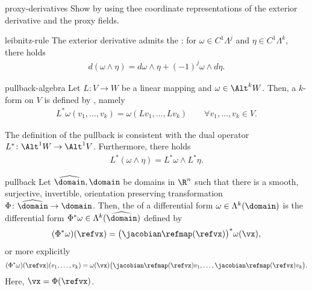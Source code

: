\begin{Problem}{proxy-derivatives}
  Show  by using thee coordinate
  representations of the exterior derivative and the proxy fields.
\end{Problem}

\begin{Lemma}{leibnitz-rule}
  The exterior derivative admits the : for
  $\omega\in C^1\Lambda^j$ and $\eta\in C^1\Lambda^k$, there holds
  \begin{gather}
    d(\omega\wedge\eta) = d\omega\wedge\eta + (-1)^j\omega\wedge d\eta.
  \end{gather}
\end{Lemma}

\begin{Definition}{pullback-algebra}
  Let $L\colon V\to W$ be a linear mapping and $\omega \in \Alt^k
  W$. Then, a $k$-form on $V$ is defined by , namely
  \begin{gather}
    L^* \omega(v_1,\dots,v_k) = \omega(Lv_1,\dots,Lv_k)
    \qquad\forall v_1,\dots,v_k\in V.
  \end{gather}
\end{Definition}

\begin{remark}
  The definition of the pullback is consistent with the dual
  operator $L^*\colon \Alt^1 W \to \Alt^1 V$. Furthermore, there holds
  \begin{gather}
    L^*(\omega\wedge\eta) = L^*\omega \wedge L^*\eta.
  \end{gather}
\end{remark}

\begin{Definition}{pullback}
  Let $\widehat\domain,\domain$ be domains in $\R^n$ such that there is a
  smooth, surjective, invertible, orientation preserving transformation
  $\Phi\colon \widehat\domain \to \domain$. Then, the  of a
  differential form $\omega \in\Lambda^k(\domain)$ is the
  differential form $\Phi^*\omega \in \Lambda^k(\widehat\domain)$ defined by
  \begin{gather}
    (\Phi^*\omega)(\refvx) = \bigl(\jacobian\refmap(\refvx)\bigr)^*\omega(\vx),
  \end{gather}
  or more explicitly
  \begin{gather}
    (\Phi^*\omega)(\refvx)(v_1,\dots,v_k)
    = \omega(\vx)\bigl(\jacobian\refmap(\refvx)v_1,\dots,\jacobian\refmap(\refvx)v_k\bigr).
  \end{gather}
  Here, $\vx = \Phi(\refvx)$.
\end{Definition}

